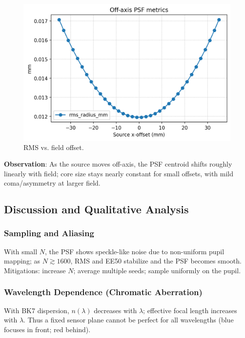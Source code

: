 \documentclass[11pt,a4paper]{article}
\begin{document}
	\begin{figure}[H]
		\centering
		\includegraphics[width=\linewidth]{offaxis/metrics_vs_x_off_mm.png}
		\caption{RMS vs. field offset.}
	\end{figure}
	
	\textbf{Observation}: As the source moves off-axis, the PSF centroid shifts roughly linearly with field; core size stays nearly constant for small offsets, with mild coma/asymmetry at larger field.
	
	\subsection{Discussion and Qualitative Analysis}\label{discussion}
	
	\subsubsection*{Sampling and Aliasing}
	
	With small \(N\), the PSF shows speckle-like noise due to non-uniform pupil mapping; as \(N \gtrsim 1600\), RMS and EE50 stabilize and the PSF becomes smooth.
	Mitigations: increase \(N\); average multiple seeds; sample uniformly on the pupil.
	

	
	\subsubsection*{Wavelength Dependence (Chromatic Aberration)}
	
	With BK7 dispersion, \(n(\lambda)\) decreases with \(\lambda\); effective focal length increases with \(\lambda\).
	Thus a fixed sensor plane cannot be perfect for all wavelengths (blue focuses in front; red behind).
	
\end{document}
